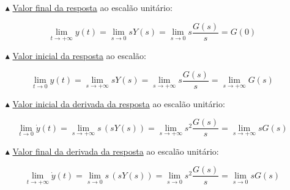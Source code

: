 {

\begin{mdframed}
    \begin{itemize}
    \item[$\blacktriangle$] \underline{Valor final da resposta} ao escalão unitário:
        
        \vspace{-1em}
        $$
            \lim_{t \to +\infty} y(t) = \lim_{s \to 0} sY(s) = \lim_{s \to 0} s\frac{G(s)}{s} = G(0)
        $$
        
    \vspace{-0.5em}
    \item[$\blacktriangle$] \underline{Valor inicial da resposta} ao escalão:
        
        \vspace{-1em}
        $$
            \lim_{t \to 0} y(t) = \lim_{s \to +\infty} sY(s) = \lim_{s \to +\infty} s\frac{G(s)}{s} = \lim_{s \to +\infty} G(s)
        $$
        
    \vspace{-0.5em}
    \item[$\blacktriangle$] \underline{Valor inicial da derivada da resposta} ao escalão unitário:
        
        \vspace{-1em}
        $$
            \lim_{t \to 0} \dot{y}(t) = \lim_{s \to +\infty} s\, (sY(s)) = \lim_{s \to +\infty} s^2\frac{G(s)}{s} = \lim_{s \to +\infty} sG(s)
        $$

    \vspace{-0.5em}
    \item[$\blacktriangle$] \underline{Valor final da derivada da resposta} ao escalão unitário:
        
        \vspace{-1em}
        $$
            \lim_{t \to +\infty} \dot{y}(t) = \lim_{s \to 0} s\, (sY(s)) = \lim_{s \to 0} s^2\frac{G(s)}{s} = \lim_{s \to 0} s G(s)
        $$
    \end{itemize}
\end{mdframed}
}

\vspace{-1em}
